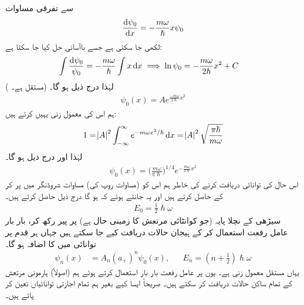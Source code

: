 سے تفرقی مساوات
\begin{align*}
\frac{ \dif \psi_0}{\dif x } = -\frac{m \omega }{ \hslash } x \psi_0
\end{align*}
لکھی جا سکتی ہے جسے باآسانی حل کیا جا سکتا ہے: 
\begin{align*}
\int{\frac{ \dif \psi_0 }{ \psi_0 } } &= -\frac{ m \omega }{ \hslash } \int{ x \dif x } \implies \ln \psi_0 = 
-\frac{m \omega }{ 2 \hslash } x^2 +C 
\end{align*} 
( مستقل ہے۔) لہٰذا درج ذیل ہو گا۔
\begin{align*}
\psi_0 (x) = A e^{\frac{ - m \omega }{ 2 \hslash } x^2}
\end{align*}
ہم اس کی  معمول زنی  یہیں کرتے ہیں: 
\begin{align*}
1 = \abs{A}^2 \int_{ - \infty}^{ \infty } e^{- m \omega x^2/ \hslash} \dif x = \abs{A}^2 \sqrt{ \frac{ \pi \hslash }{ m \omega }}
\end{align*}
لہٰذا  اور درج ذیل ہو گا۔
\\
\begin{align}\label{مساوات_شروڈنگر_معمول_شدہ_حال_صفر}
\psi_0 (x) = \big(\frac{ m \omega }{ \pi \hslash}\big)^{1/4} e^{-\frac{ m \omega }{ 2 \hslash} x^2}
\end{align}
اس حال کی توانائی دریافت کرنے کی خاطر ہم اس کو (مساوات  روپ کی) مساوات شروڈنگر میں پر کر کے  حاصل کرتے ہیں اور یہ جانتے ہوئے کہ  ہو گا درج ذیل حاصل کرتے ہیں۔
\begin{align}
 E_0 = \frac{1}{2} \hslash \omega 
\end{align}
سیڑھی کے نچلا پایہ (جو کوانٹائی مرتعش کا زمینی حال ہے) پر پیر رکھ کر، بار بار عامل رفعت استعمال کر کے ہیجان حالات دریافت کیے جا سکتے ہیں جہاں ہر قدم پر توانائی میں  کا اضافہ ہو گا۔
\begin{align}\label{مساوات_شروڈنگر_ہارمونی_حالات}
\psi_n (x) &= A_n ( a_+)^n \psi_0(x) , && E_n = ( n + \tfrac{1}{2}) \hslash \omega
\end{align}
یہاں  مستقل معمول زنی ہے۔ یوں  پر عامل رفعت بار بار استعمال کرتے ہوئے ہم (اصولاً) ہارمونی مرتعش کے تمام ساکن حالات دریافت کر سکتے ہیں۔ صریحاً ایسا کیے بغیر ہم تمام اجازتی توانائیاں تعین کر پائے ہیں۔


